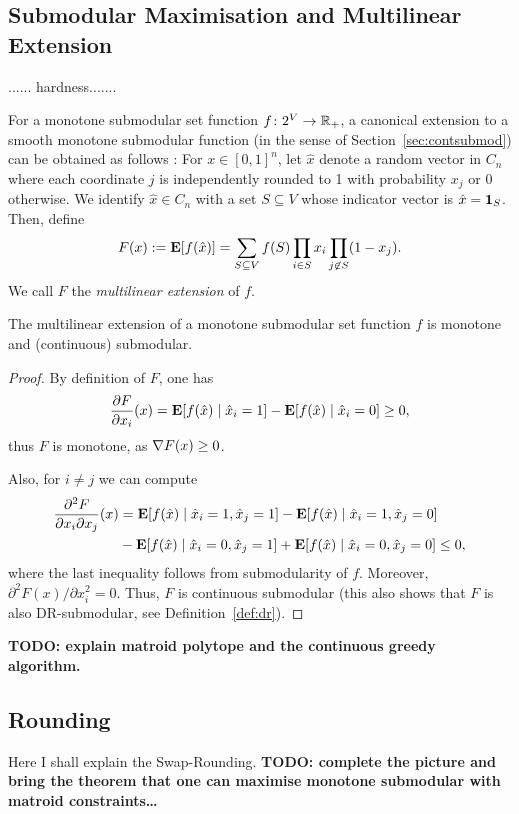 \subsection{Submodular Maximisation and Multilinear Extension}

...... hardness.......


For a monotone submodular set function $f\colon 2^V \to \mathbb{R}_+$, a canonical extension to a smooth monotone submodular function (in the sense of Section~\ref{sec:contsubmod}) can be obtained as follows \citep{Calinescu2011}: For $x \in [0, 1]^n$, let $\hat{x}$ denote a random vector in $C_n$ where each coordinate $j$ is independently rounded to 1 with probability $x_j$ or 0 otherwise. We identify $\hat{x} \in C_n$ with a set $S \subseteq V$ whose indicator vector is $\hat{x} = \mathbf{1}_S$. Then, define
\[
    F(x) := \mathbf{E}[f(\hat{x})] = \sum_{S\subseteq V} f(S)\prod_{i\in S} x_i \prod_{j\not\in S}(1-x_j).
\]
We call $F$ the \emph{multilinear extension} of $f$.

\begin{lemma}
    The multilinear extension of a monotone submodular set function $f$ is monotone and (continuous) submodular.
\end{lemma}
\begin{proof}
    By definition of $F$, one has
    \[
        \frac{\partial F}{\partial x_i}(x) = \mathbf{E}[f(\hat{x})\mid \hat{x}_i = 1] - \mathbf{E}[f(\hat{x})\mid \hat{x}_i = 0] \geq 0,
    \]
    thus $F$ is monotone, as $\nabla F(x) \geq 0$.

    Also, for $i\neq j$ we can compute
    \begin{align*}
        \frac{\partial^2 F}{\partial x_i\partial x_j}(x) &= \mathbf{E}[f(\hat{x})\mid \hat{x}_i = 1, \hat{x}_j = 1] - \mathbf{E}[f(\hat{x})\mid \hat{x}_i = 1, \hat{x}_j = 0] \\
                                                         &- \mathbf{E}[f(\hat{x})\mid \hat{x}_i = 0, \hat{x}_j = 1] + \mathbf{E}[f(\hat{x})\mid \hat{x}_i = 0, \hat{x}_j = 0] 
                                                         \leq 0,
    \end{align*}
    where the last inequality follows from submodularity of $f$. Moreover, $\partial^2 F(x)/\partial x_i^2 = 0$. Thus, $F$ is continuous submodular (this also shows that $F$ is also DR-submodular, see Definition~\ref{def:dr}).
\end{proof}

\textbf{TODO: explain matroid polytope and the continuous greedy algorithm.}

\subsection{Rounding} Here I shall explain the Swap-Rounding. \textbf{TODO: complete the picture and bring the theorem that one can maximise monotone submodular with matroid constraints\dots}


